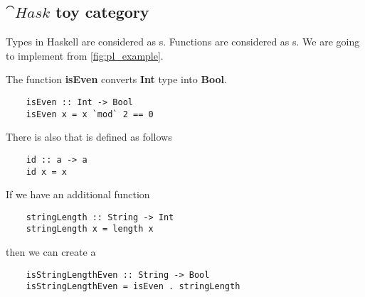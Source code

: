 \subsection{$\cat{Hask}$ toy category}
\begin{example}
  \label{ex:haskcategory}
  Types in Haskell are considered as s.
  Functions are considered as s.
  We are going to implement  from
  \cref{fig:pl_example}.

  The function \textbf{isEven}
  converts \textbf{Int} type 
  into \textbf{Bool}.
  \begin{verbatim}
    isEven :: Int -> Bool
    isEven x = x `mod` 2 == 0
  \end{verbatim}

  There is also  that is defined as follows
  \begin{verbatim}
    id :: a -> a
    id x = x
  \end{verbatim}

  If we have an additional function
  \begin{verbatim}
    stringLength :: String -> Int
    stringLength x = length x
  \end{verbatim}
  then we can create a 
  \begin{verbatim}
    isStringLengthEven :: String -> Bool
    isStringLengthEven = isEven . stringLength
  \end{verbatim}

\end{example}

